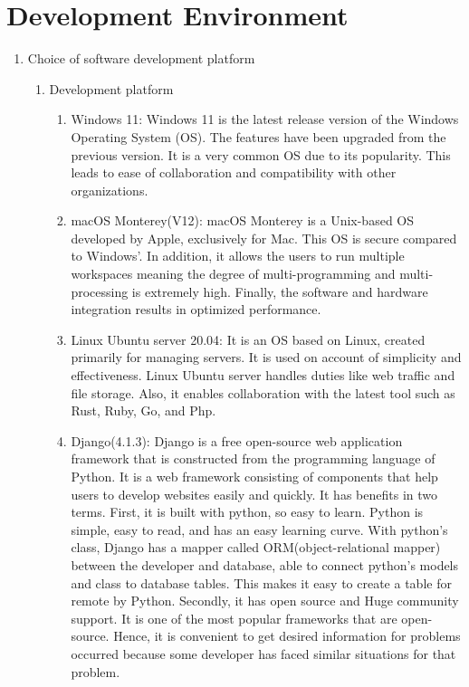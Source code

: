 \documentclass[conference]{IEEEtran}
\begin{document}
\section{\Large{Development Environment}}
\begin{enumerate}[label=\arabic*.]
    \item {\large{Choice of software development platform}} \\
    \begin{enumerate}[label=\alph*.]
        \item {\large{Development platform}} \\
        \begin{enumerate}[label=\roman*.]
            \item {\large{Windows 11: Windows 11 is the latest release version of the Windows Operating System (OS). The features have been upgraded from the previous version. It is a very common OS due to its popularity. This leads to ease of collaboration and compatibility with other organizations. }} \\
            \item {\large{macOS Monterey(V12): macOS Monterey is a Unix-based OS developed by Apple, exclusively for Mac. This OS is secure compared to Windows’. In addition, it allows the users to run multiple workspaces meaning the degree of multi-programming and multi-processing is extremely high. Finally, the software and hardware integration results in optimized performance. }} \\
            \item {\large{Linux Ubuntu server 20.04:  It is an OS based on Linux, created primarily for managing servers. It is used on account of simplicity and effectiveness. Linux Ubuntu server handles duties like web traffic and file storage. Also, it enables collaboration with the latest tool such as Rust, Ruby, Go, and Php. }} \\
            \item {\large{Django(4.1.3): Django is a free open-source web application framework that is constructed from the programming language of Python. It is a web framework consisting of components that help users to develop websites easily and quickly. It has benefits in two terms. First, it is built with python, so easy to learn. Python is simple, easy to read, and has an easy learning curve. With python’s class, Django has a mapper called ORM(object-relational mapper) between the developer and database, able to connect python’s models and class to database tables. This makes it easy to create a table for remote by Python. Secondly, it has open source and Huge community support. It is one of the most popular frameworks that are open-source. Hence, it is convenient to get desired information for problems occurred because some developer has faced similar situations for that problem. }} \\       

\end{enumerate}
\end{enumerate}
\end{enumerate}
\end{document}
